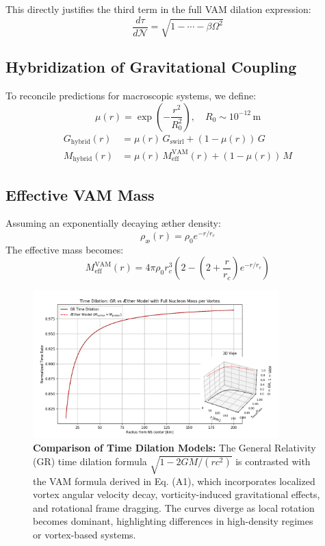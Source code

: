This directly justifies the third term in the full VAM dilation expression:
\[
    \frac{d\tau}{d\mathcal{N}} = \sqrt{1 - \cdots - \beta \Omega^2}
\]


\subsection{Hybridization of Gravitational Coupling}

To reconcile predictions for macroscopic systems, we define:
\[
    \mu(r) = \exp\left(-\frac{r^2}{R_0^2}\right), \quad R_0 \sim 10^{-12} \, \mathrm{m}
\]
\begin{align*}
    G_{\text{hybrid}}(r) &= \mu(r) \, G_{\text{swirl}} + (1 - \mu(r)) \, G \\
    M_{\text{hybrid}}(r) &= \mu(r) \, M_{\text{eff}}^\text{VAM}(r) + (1 - \mu(r)) \, M
\end{align*}

\subsection{Effective VAM Mass}
Assuming an exponentially decaying æther density:
\[
\rho_\text{\ae}(r) = \rho_0 e^{-r / r_c}
\]
The effective mass becomes:
\[
M_\text{eff}^\text{VAM}(r) = 4\pi \rho_0 r_c^3 \left(2 - \left(2 + \frac{r}{r_c} \right) e^{-r/r_c} \right)
\]

\begin{figure}[H]
  \centering
  \includegraphics[width=0.85\textwidth]{images/07-TimeDilationGRVsVAM}
  \caption{
  \textbf{Comparison of Time Dilation Models:} The General Relativity (GR) time dilation formula \(\sqrt{1 - 2GM/(rc^2)}\) is contrasted with the VAM formula derived in Eq. (A1), which incorporates localized vortex angular velocity decay, vorticity-induced gravitational effects, and rotational frame dragging. The curves diverge as local rotation becomes dominant, highlighting differences in high-density regimes or vortex-based systems.
  }
  \label{fig:GRvsVAMTimeDilation}
\end{figure}



